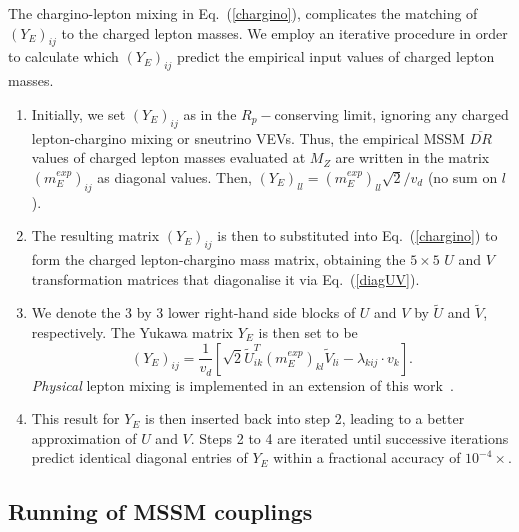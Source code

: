 \documentclass[final,3p,times,pdflatex]{elsarticle}
\begin{document}
The chargino-lepton mixing in Eq.~(\ref{chargino}), complicates the
matching of $(Y_E)_{ij}$ to the charged lepton masses. We employ
an iterative procedure in order to calculate
which $(Y_E)_{ij}$ predict the empirical input values of charged lepton masses.
\begin{enumerate}
\item
Initially, we set $(Y_E)_{ij}$ as in the $R_p-$conserving limit, ignoring any
charged lepton-chargino mixing or sneutrino VEVs. Thus, the empirical MSSM
$\overline{DR}$ values of charged lepton masses evaluated at $M_Z$ are
written in the matrix $(m_E^{exp})_{ij}$ as diagonal values. Then, 
$(Y_{E})_{ll}= (m_E^{exp})_{ll} \sqrt{2} / v_d$ (no sum on $l$). 
\item
The resulting matrix $(Y_E)_{ij}$ is then to substituted  into
Eq.~(\ref{chargino}) to form
the charged
lepton-chargino mass matrix, obtaining the $5\times 5$ $U$ and $V$
transformation matrices that diagonalise it via Eq.~(\ref{diagUV}). 
\item
We denote the 3 by 3 lower right-hand side blocks of $U$ and $V$ by $\tilde U$
and $\tilde V$, respectively. The Yukawa matrix $Y_E$ is then set to be
\begin{equation}
(Y_{E})_{ij} = \frac{1}{v_d}\left[\sqrt{2}{\tilde
      U}^T_{ik}(m_E^{exp})_{kl}{\tilde V}_{li}-\lambda_{kij}\cdot v_k\right].
\end{equation}
{\em Physical}\/ lepton mixing is implemented in an extension of this
work~\cite{rpvneut}. 
\item
This result for $Y_E$ is then 
inserted back into step 2, leading to a better
approximation of $U$ and $V$. Steps 2 to 4 are iterated until successive
iterations predict identical diagonal entries of $Y_E$ within a fractional
accuracy of $10^{-4}\times $.
\end{enumerate}


\subsection{Running of MSSM couplings~\label{running}}
\end{document}

